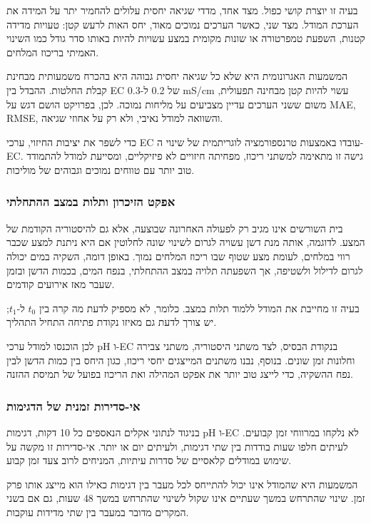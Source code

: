 בעיה זו יוצרת קושי כפול. מצד אחד, מדדי שגיאה יחסית עלולים להחמיר יתר על המידה את הערכת המודל. מצד שני, כאשר הערכים נמוכים מאוד, יחס האות לרעש קטן: טעויות מדידה קטנות, השפעת טמפרטורה או שונות מקומית במצע עשויות להיות באותו סדר גודל כמו השינוי האמיתי בריכוז המלחים.

המשמעות האגרונומית היא שלא כל שגיאה יחסית גבוהה היא בהכרח משמעותית מבחינת קבלת החלטות. ההבדל בין EC של 0.2 ל-0.3 mS/cm עשוי להיות קטן מבחינה תפעולית, משום ששני הערכים עדיין מצביעים על מליחות נמוכה. לכן, בפרויקט הושם דגש על MAE, RMSE, \Rtwo{} והשוואה למודל נאיבי, ולא רק על אחוזי שגיאה.

כדי לשפר את יציבות החיזוי, ערכי EC עובדו באמצעות טרנספורמציה לוגריתמית של שינוי ה-EC. גישה זו מתאימה למשתני ריכוז, מפחיתה חיזויים לא פיזיקליים, ומסייעת למודל להתמודד טוב יותר עם טווחים נמוכים וגבוהים של מוליכות.

\subsubsection{אפקט הזיכרון ותלות במצב ההתחלתי}
בית השורשים אינו מגיב רק לפעולה האחרונה שבוצעה, אלא גם להיסטוריה הקודמת של המצע. לדוגמה, אותה מנת דשן עשויה לגרום לשינוי שונה לחלוטין אם היא ניתנת למצע שכבר רווי במלחים, לעומת מצע שטוף שבו ריכוז המלחים נמוך. באופן דומה, השקיה במים יכולה לגרום לדילול ולשטיפה, אך השפעתה תלויה במצב ההתחלתי, בנפח המים, בכמות הדשן ובזמן שעבר מאז אירועים קודמים.

בעיה זו מחייבת את המודל ללמוד תלות במצב. כלומר, לא מספיק לדעת מה קרה בין $t_0$ ל-$t_1$; יש צורך לדעת גם מאיזו נקודת פתיחה התחיל התהליך.

לכן הוכנסו למודל ערכי pH ו-EC בנקודת הבסיס, לצד משתני היסטוריה, משתני צבירה וחלונות זמן שונים. בנוסף, נבנו משתנים המייצגים יחסי ריכוז, כגון היחס בין כמות הדשן לבין נפח ההשקיה, כדי לייצג טוב יותר את אפקט המהילה ואת הריכוז בפועל של תמיסת ההזנה.

\subsubsection{אי-סדירות זמנית של הדגימות}
בניגוד לנתוני אקלים הנאספים כל 10 דקות, דגימות pH ו-EC לא נלקחו במרווחי זמן קבועים. לעיתים חלפו שעות בודדות בין שתי דגימות, ולעיתים יום או יותר. אי-סדירות זו מקשה על שימוש במודלים קלאסיים של סדרות עיתיות, המניחים לרוב צעד זמן קבוע.

המשמעות היא שהמודל אינו יכול להתייחס לכל מעבר בין דגימות כאילו הוא מייצג אותו פרק זמן. שינוי שהתרחש במשך שעתיים אינו שקול לשינוי שהתרחש במשך 48 שעות, גם אם בשני המקרים מדובר במעבר בין שתי מדידות עוקבות.

